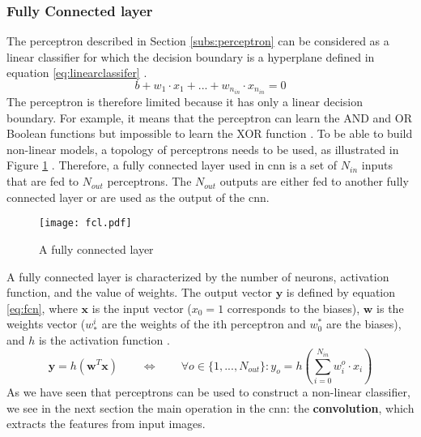 \subsubsection{Fully Connected layer} \label{subs:fcl}
The perceptron described in Section \ref{subs:perceptron} can be considered as a linear classifier for which the decision boundary is a hyperplane defined in equation \eqref{eq:linearclassifer} \cite{matteucci_artificial_2019}.
%
\begin{equation}
    b + w_1 \cdot x_1 + ... + w_{n_{in}} \cdot x_{n_{in}} = 0
    \label{eq:linearclassifer}
\end{equation}
%
The perceptron is therefore limited because it has only a linear decision boundary. For example, it means that the perceptron can learn the AND and OR Boolean functions but impossible to learn the XOR function \cite{minsky_perceptrons_1969}. To be able to build non-linear models, a topology of perceptrons needs to be used, as illustrated in Figure \ref{fig:fcn} \cite{khan_survey_2020}. Therefore, a fully connected layer used in \acrshort{cnn} is a set of $N_{in}$ inputs that are fed to $N_{out}$ perceptrons. The $N_{out}$ outputs are either fed to another fully connected layer or are used as the output of the \acrshort{cnn}.
%
\begin{figure}[H]
    \centering
    \texttt{[image: fcl.pdf]}
    \caption{A fully connected layer}
    \label{fig:fcn}
\end{figure}
%
A fully connected layer is characterized by the number of neurons, activation function, and the value of weights. The output vector $\boldsymbol{y}$ is defined by equation \eqref{eq:fcn}, where $\boldsymbol{x}$ is the input vector ($x_0 = 1$ corresponds to the biases), $\boldsymbol{w}$ is the weights vector ($w^i_*$ are the weights of the ith perceptron and $w^*_0$ are the biases), and $h$ is the activation function \cite{abdelouahab_accelerating_2018}.
%
\begin{equation}
    \boldsymbol{y} = h(\boldsymbol{w}^T \boldsymbol{x}) \qquad \Leftrightarrow \qquad \forall o \in \{ 1, ..., N_{out} \} : y_o = h(\sum^{N_{in}}_{i=0} w^o_i \cdot x_i)
    \label{eq:fcn}
\end{equation}
%
As we have seen that perceptrons can be used to construct a non-linear classifier, we see in the next section the main operation in the \acrshort{cnn}: the \textbf{convolution}, which extracts the features from input images.